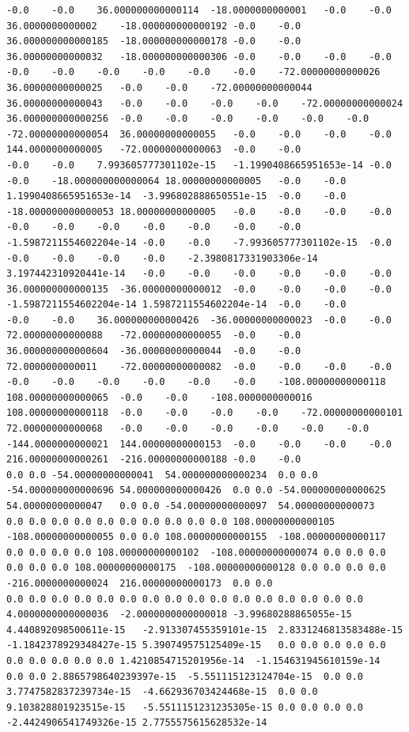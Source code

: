 \documentclass[12pt]{report} %
\begin{document}
\begin{landscape}
\begin{lstlisting}[numbers=none, basicstyle=\ttfamily\tiny, captionpos=b, caption={Matriz de coeficientes $W = G^{-1}$ ($54\times54$) calculada con Julia, sin redondear.}, label=cod:W-julia]
-0.0	-0.0	36.000000000000114	-18.0000000000001	-0.0	-0.0	36.0000000000002	-18.000000000000192	-0.0	-0.0	36.000000000000185	-18.000000000000178	-0.0	-0.0	36.00000000000032	-18.000000000000306	-0.0	-0.0	-0.0	-0.0	-0.0	-0.0	-0.0	-0.0	-0.0	-0.0	-72.00000000000026	36.00000000000025	-0.0	-0.0	-72.00000000000044	36.00000000000043	-0.0	-0.0	-0.0	-0.0	-72.00000000000024	36.000000000000256	-0.0	-0.0	-0.0	-0.0	-0.0	-0.0	-72.00000000000054	36.00000000000055	-0.0	-0.0	-0.0	-0.0	144.0000000000005	-72.00000000000063	-0.0	-0.0
-0.0	-0.0	7.993605777301102e-15	-1.1990408665951653e-14	-0.0	-0.0	-18.000000000000064	18.00000000000005	-0.0	-0.0	1.1990408665951653e-14	-3.996802888650551e-15	-0.0	-0.0	-18.000000000000053	18.00000000000005	-0.0	-0.0	-0.0	-0.0	-0.0	-0.0	-0.0	-0.0	-0.0	-0.0	-0.0	-1.5987211554602204e-14	-0.0	-0.0	-7.993605777301102e-15	-0.0	-0.0	-0.0	-0.0	-0.0	-2.3980817331903306e-14	3.197442310920441e-14	-0.0	-0.0	-0.0	-0.0	-0.0	-0.0	36.000000000000135	-36.00000000000012	-0.0	-0.0	-0.0	-0.0	-1.5987211554602204e-14	1.5987211554602204e-14	-0.0	-0.0
-0.0	-0.0	36.000000000000426	-36.00000000000023	-0.0	-0.0	72.00000000000088	-72.00000000000055	-0.0	-0.0	36.000000000000604	-36.00000000000044	-0.0	-0.0	72.0000000000011	-72.00000000000082	-0.0	-0.0	-0.0	-0.0	-0.0	-0.0	-0.0	-0.0	-0.0	-0.0	-108.00000000000118	108.00000000000065	-0.0	-0.0	-108.0000000000016	108.00000000000118	-0.0	-0.0	-0.0	-0.0	-72.00000000000101	72.00000000000068	-0.0	-0.0	-0.0	-0.0	-0.0	-0.0	-144.0000000000021	144.00000000000153	-0.0	-0.0	-0.0	-0.0	216.00000000000261	-216.00000000000188	-0.0	-0.0
0.0	0.0	-54.00000000000041	54.000000000000234	0.0	0.0	-54.000000000000696	54.000000000000426	0.0	0.0	-54.000000000000625	54.00000000000047	0.0	0.0	-54.00000000000097	54.00000000000073	0.0	0.0	0.0	0.0	0.0	0.0	0.0	0.0	0.0	0.0	108.00000000000105	-108.00000000000055	0.0	0.0	108.00000000000155	-108.00000000000117	0.0	0.0	0.0	0.0	108.00000000000102	-108.00000000000074	0.0	0.0	0.0	0.0	0.0	0.0	108.00000000000175	-108.00000000000128	0.0	0.0	0.0	0.0	-216.0000000000024	216.00000000000173	0.0	0.0
0.0	0.0	0.0	0.0	0.0	0.0	0.0	0.0	0.0	0.0	0.0	0.0	0.0	0.0	0.0	0.0	4.0000000000000036	-2.0000000000000018	-3.99680288865055e-15	4.440892098500611e-15	-2.913307455359101e-15	2.8331246813583488e-15	-1.1842378929348427e-15	5.390749575125409e-15	0.0	0.0	0.0	0.0	0.0	0.0	0.0	0.0	0.0	0.0	1.4210854715201956e-14	-1.154631945610159e-14	0.0	0.0	2.8865798640239397e-15	-5.551115123124704e-15	0.0	0.0	3.7747582837239734e-15	-4.662936703424468e-15	0.0	0.0	9.103828801923515e-15	-5.5511151231235305e-15	0.0	0.0	0.0	0.0	-2.4424906541749326e-15	2.7755575615628532e-14

\end{lstlisting}
\end{landscape}
\end{document}
